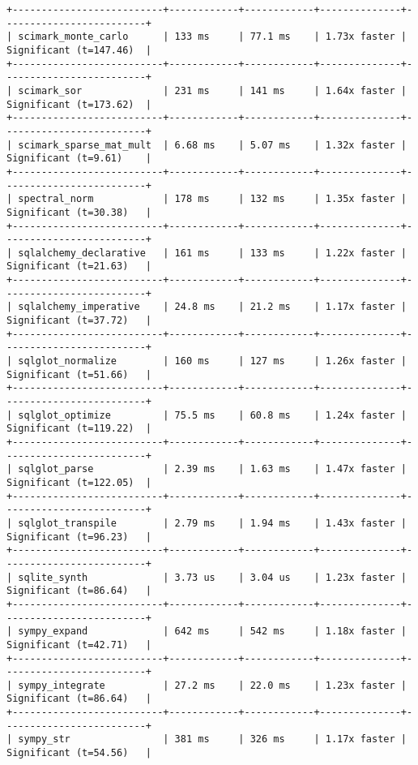 \begin{code}
\begin{verbatim}
+--------------------------+------------+------------+--------------+-------------------------+
| scimark_monte_carlo      | 133 ms     | 77.1 ms    | 1.73x faster | Significant (t=147.46)  |
+--------------------------+------------+------------+--------------+-------------------------+
| scimark_sor              | 231 ms     | 141 ms     | 1.64x faster | Significant (t=173.62)  |
+--------------------------+------------+------------+--------------+-------------------------+
| scimark_sparse_mat_mult  | 6.68 ms    | 5.07 ms    | 1.32x faster | Significant (t=9.61)    |
+--------------------------+------------+------------+--------------+-------------------------+
| spectral_norm            | 178 ms     | 132 ms     | 1.35x faster | Significant (t=30.38)   |
+--------------------------+------------+------------+--------------+-------------------------+
| sqlalchemy_declarative   | 161 ms     | 133 ms     | 1.22x faster | Significant (t=21.63)   |
+--------------------------+------------+------------+--------------+-------------------------+
| sqlalchemy_imperative    | 24.8 ms    | 21.2 ms    | 1.17x faster | Significant (t=37.72)   |
+--------------------------+------------+------------+--------------+-------------------------+
| sqlglot_normalize        | 160 ms     | 127 ms     | 1.26x faster | Significant (t=51.66)   |
+--------------------------+------------+------------+--------------+-------------------------+
| sqlglot_optimize         | 75.5 ms    | 60.8 ms    | 1.24x faster | Significant (t=119.22)  |
+--------------------------+------------+------------+--------------+-------------------------+
| sqlglot_parse            | 2.39 ms    | 1.63 ms    | 1.47x faster | Significant (t=122.05)  |
+--------------------------+------------+------------+--------------+-------------------------+
| sqlglot_transpile        | 2.79 ms    | 1.94 ms    | 1.43x faster | Significant (t=96.23)   |
+--------------------------+------------+------------+--------------+-------------------------+
| sqlite_synth             | 3.73 us    | 3.04 us    | 1.23x faster | Significant (t=86.64)   |
+--------------------------+------------+------------+--------------+-------------------------+
| sympy_expand             | 642 ms     | 542 ms     | 1.18x faster | Significant (t=42.71)   |
+--------------------------+------------+------------+--------------+-------------------------+
| sympy_integrate          | 27.2 ms    | 22.0 ms    | 1.23x faster | Significant (t=86.64)   |
+--------------------------+------------+------------+--------------+-------------------------+
| sympy_str                | 381 ms     | 326 ms     | 1.17x faster | Significant (t=54.56)   |

\end{verbatim}
\end{code}
